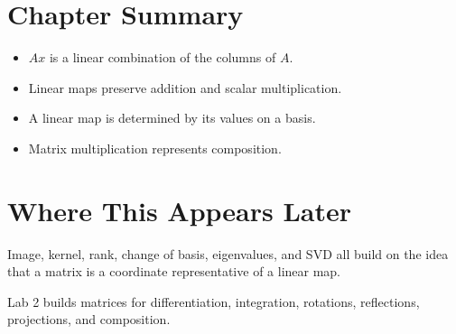 \section*{Chapter Summary}

\begin{itemize}
  \item $Ax$ is a linear combination of the columns of $A$.
  \item Linear maps preserve addition and scalar multiplication.
  \item A linear map is determined by its values on a basis.
  \item Matrix multiplication represents composition.
\end{itemize}

\section*{Where This Appears Later}

Image, kernel, rank, change of basis, eigenvalues, and SVD all build on the
idea that a matrix is a coordinate representative of a linear map.

\begin{labbox}
Lab 2 builds matrices for differentiation, integration, rotations,
reflections, projections, and composition.
\end{labbox}


